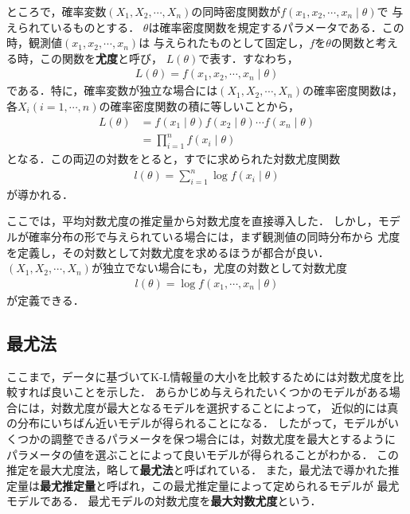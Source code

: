 ところで，確率変数$(X_1, X_2, \cdots, X_n)$の同時密度関数が$f(x_1, x_2, \cdots, x_n \mid \theta)$で
与えられているものとする．
$\theta$は確率密度関数を規定するパラメータである．この時，観測値$(x_1, x_2, \cdots, x_n)$は
与えられたものとして固定し，$f$を$\theta$の関数と考える時，この関数を\textbf{尤度}と呼び，
$L(\theta)$で表す．すなわち，
\begin{align}
  L(\theta) = f(x_1, x_2, \cdots, x_n \mid \theta)
\end{align}
である．特に，確率変数が独立な場合には$(X_1, X_2, \cdots, X_n)$の確率密度関数は，
各$X_i (i = 1, \cdots, n)$の確率密度関数の積に等しいことから，
\begin{align}
  L(\theta) &= f(x_1 \mid \theta)f(x_2 \mid \theta) \cdots f(x_n \mid \theta)\\
  &= \prod_{i=1}^{n}f(x_i \mid \theta)
\end{align}
となる．この両辺の対数をとると，すでに求められた対数尤度関数
\begin{align}
  l(\theta) = \sum_{i=1}^{n}\log f(x_i \mid \theta)
\end{align}
が導かれる．

ここでは，平均対数尤度の推定量から対数尤度を直接導入した．
しかし，モデルが確率分布の形で与えられている場合には，まず観測値の同時分布から
尤度を定義し，その対数として対数尤度を求めるほうが都合が良い．
$(X_1, X_2, \cdots, X_n)$が独立でない場合にも，尤度の対数として対数尤度
\begin{align}
  l(\theta) = \log f(x_1, \cdots, x_n \mid \theta)
\end{align}
が定義できる．

\subsection{最尤法}
ここまで，データに基づいてK-L情報量の大小を比較するためには対数尤度を比較すれば良いことを示した．
あらかじめ与えられたいくつかのモデルがある場合には，対数尤度が最大となるモデルを選択することによって，
近似的には真の分布にいちばん近いモデルが得られることになる．
したがって，モデルがいくつかの調整できるパラメータを保つ場合には，対数尤度を最大とするように
パラメータの値を選ぶことによって良いモデルが得られることがわかる．
この推定を最大尤度法，略して\textbf{最尤法}と呼ばれている．
また，最尤法で導かれた推定量は\textbf{最尤推定量}と呼ばれ，この最尤推定量によって定められるモデルが
最尤モデルである．
最尤モデルの対数尤度を\textbf{最大対数尤度}という．
